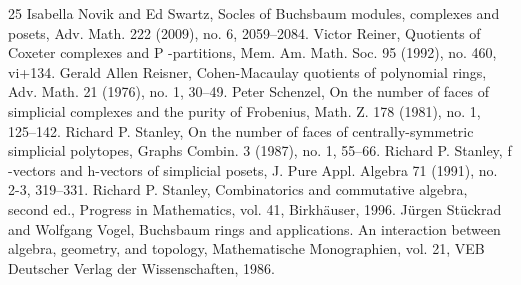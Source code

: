 \documentclass[10pt]{amsart}
\theoremstyle{definition}
\begin{document}
\begin{thebibliography}{25}
 Isabella Novik and Ed Swartz, Socles of Buchsbaum modules, complexes and posets, Adv. Math. 222 (2009), no. 6, 2059–2084.
 Victor Reiner, Quotients of Coxeter complexes and P -partitions, Mem. Am. Math. Soc. 95 (1992), no. 460, vi+134.
 Gerald Allen Reisner, Cohen-Macaulay quotients of polynomial rings, Adv. Math. 21 (1976), no. 1, 30–49.
 Peter Schenzel, On the number of faces of simplicial complexes and the purity of Frobenius, Math. Z. 178 (1981), no. 1, 125–142.
 Richard P. Stanley, On the number of faces of centrally-symmetric simplicial polytopes, Graphs Combin. 3 (1987), no. 1, 55–66.
 Richard P. Stanley, f -vectors and h-vectors of simplicial posets, J. Pure Appl. Algebra 71 (1991), no. 2-3, 319–331.
 Richard P. Stanley, Combinatorics and commutative algebra, second ed., Progress in Mathematics, vol. 41, Birkhäuser, 1996.
 Jürgen Stückrad and Wolfgang Vogel, Buchsbaum rings and applications. An interaction between algebra, geometry, and topology, Mathematische Monographien, vol. 21, VEB Deutscher Verlag der Wissenschaften, 1986.
\end{thebibliography}
\end{document}
